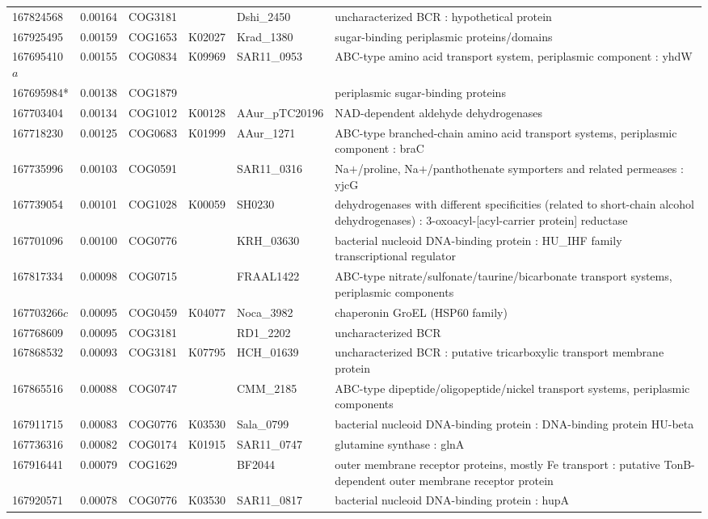 \begin{landscape}
\begin{longtable}{p{1.6cm}p{1.2cm}p{1.5cm}p{1.5cm}p{2.8cm}p{13.5cm}}
167824568&0.00164&COG3181&&Dshi\_2450&uncharacterized BCR : hypothetical protein \\
167925495&0.00159&COG1653&K02027&Krad\_1380&sugar-binding periplasmic proteins/domains \\
167695410$a$&0.00155&COG0834&K09969&SAR11\_0953&ABC-type amino acid transport system, periplasmic component : yhdW \\
167695984*&0.00138&COG1879&&&periplasmic sugar-binding proteins \\
167703404&0.00134&COG1012&K00128&AAur\_pTC20196&NAD-dependent aldehyde dehydrogenases \\
167718230&0.00125&COG0683&K01999&AAur\_1271&ABC-type branched-chain amino acid transport systems, periplasmic component : braC \\
167735996&0.00103&COG0591&&SAR11\_0316&Na$+$/proline, Na$+$/panthothenate symporters and related permeases : yjcG \\
167739054&0.00101&COG1028&K00059&SH0230&dehydrogenases with different specificities (related to short-chain alcohol dehydrogenases) : 3-oxoacyl-[acyl-carrier protein] reductase \\
167701096&0.00100&COG0776&&KRH\_03630&bacterial nucleoid DNA-binding protein : HU\_IHF family transcriptional regulator \\
167817334&0.00098&COG0715&&FRAAL1422&ABC-type nitrate/sulfonate/taurine/bicarbonate transport systems, periplasmic components \\
167703266$c$&0.00095&COG0459&K04077&Noca\_3982&chaperonin GroEL (HSP60 family) \\
167768609&0.00095&COG3181&&RD1\_2202&uncharacterized BCR \\
167868532&0.00093&COG3181&K07795&HCH\_01639&uncharacterized BCR : putative tricarboxylic transport membrane protein \\
167865516&0.00088&COG0747&&CMM\_2185&ABC-type dipeptide/oligopeptide/nickel transport systems, periplasmic components \\
167911715&0.00083&COG0776&K03530&Sala\_0799&bacterial nucleoid DNA-binding protein : DNA-binding protein HU-beta \\
167736316&0.00082&COG0174&K01915&SAR11\_0747&glutamine synthase : glnA \\
167916441&0.00079&COG1629&&BF2044&outer membrane receptor proteins, mostly Fe transport : putative TonB-dependent outer membrane receptor protein \\
167920571&0.00078&COG0776&K03530&SAR11\_0817&bacterial nucleoid DNA-binding protein : hupA \\

\end{longtable}
\end{landscape}
